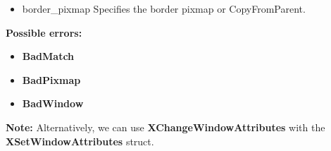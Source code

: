 \documentclass{report}
\begin{document}
\begin{itemize}
\begin{itemize}
                \item border\_pixmap Specifies the border pixmap or CopyFromParent.
            \end{itemize}
            \bigbreak \noindent
            \textbf{Possible errors:}
            \begin{itemize}
                \item \textbf{BadMatch}
                \item \textbf{BadPixmap}
                \item \textbf{BadWindow}
            \end{itemize}
            \textbf{Note:} Alternatively, we can use \textbf{XChangeWindowAttributes} with the \textbf{XSetWindowAttributes} struct.



    \end{itemize}

    \pagebreak 
\end{document}
